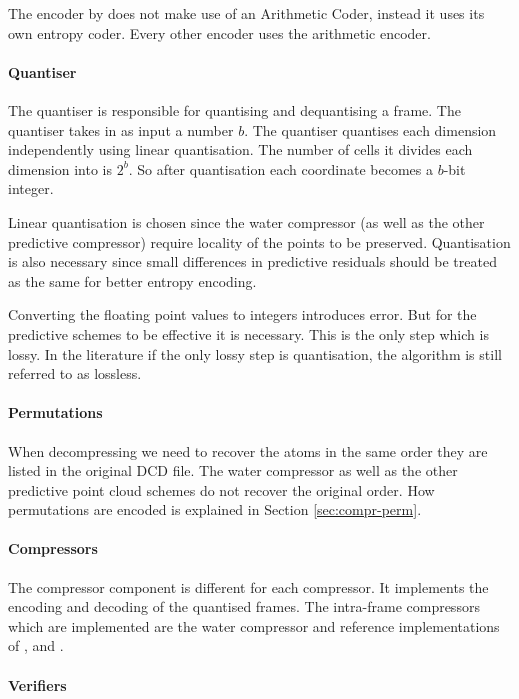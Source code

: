 \documentclass[a4paper]{report}
\begin{document}
The encoder by \citep{omeltchenko2000sls} does not make use of an Arithmetic
Coder, instead it uses its own entropy coder. Every other encoder uses the
arithmetic encoder.


\paragraph{Quantiser}

The quantiser is responsible for quantising and dequantising a frame. The
quantiser takes in as input a number $b$. The quantiser quantises each
dimension independently using linear quantisation. The number of cells it
divides each dimension into is $2^b$. So after quantisation each coordinate
becomes a $b$-bit integer.

Linear quantisation is chosen since the water compressor (as well as the other
predictive compressor) require locality of the points to be
preserved. Quantisation is also necessary since small differences in
predictive residuals should be treated as the same for better entropy
encoding.

Converting the floating point values to integers introduces error. But for the
predictive schemes to be effective it is necessary. This is the only step
which is lossy. In the literature if the only lossy step is quantisation, the
algorithm is still referred to as lossless.


\paragraph{Permutations}

When decompressing we need to recover the atoms in the same order they are
listed in the original DCD file. The water compressor as well as the other
predictive point cloud schemes do not recover the original order. How
permutations are encoded is explained in Section \ref{sec:compr-perm}.


\paragraph{Compressors}

The compressor component is different for each compressor. It implements the
encoding and decoding of the quantised frames. The intra-frame compressors
which are implemented are the water compressor and reference implementations
of \citep{omeltchenko2000sls}, \citep{gumholdcomp} and
\citep{devillers2000gci}.


\paragraph{Verifiers}
\end{document}
